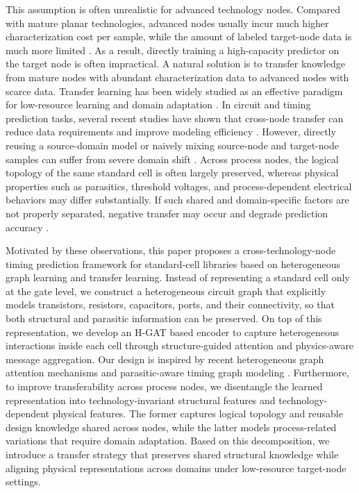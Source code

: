 This assumption is often unrealistic for advanced technology nodes. Compared with mature planar technologies, advanced nodes usually incur much higher characterization cost per sample, while the amount of labeled target-node data is much more limited \cite{amuru2024pvt,zhang2024disentangle}. As a result, directly training a high-capacity predictor on the target node is often impractical. A natural solution is to transfer knowledge from mature nodes with abundant characterization data to advanced nodes with scarce data. Transfer learning has been widely studied as an effective paradigm for low-resource learning and domain adaptation \cite{weiss2016survey,zhuang2021survey,dai2009eigentransfer,ganin2016dann}. In circuit and timing prediction tasks, several recent studies have shown that cross-node transfer can reduce data requirements and improve modeling efficiency \cite{shrestha2024arrival,amuru2024pvt,zhang2025prerouting}. However, directly reusing a source-domain model or naively mixing source-node and target-node samples can suffer from severe domain shift \cite{zhang2024disentangle}. Across process nodes, the logical topology of the same standard cell is often largely preserved, whereas physical properties such as parasitics, threshold voltages, and process-dependent electrical behaviors may differ substantially. If such shared and domain-specific factors are not properly separated, negative transfer may occur and degrade prediction accuracy \cite{tang2024semisupervised,tang2025knowledge,zhang2024disentangle}.

Motivated by these observations, this paper proposes a cross-technology-node timing prediction framework for standard-cell libraries based on heterogeneous graph learning and transfer learning. Instead of representing a standard cell only at the gate level, we construct a heterogeneous circuit graph that explicitly models transistors, resistors, capacitors, ports, and their connectivity, so that both structural and parasitic information can be preserved. On top of this representation, we develop an H-GAT based encoder to capture heterogeneous interactions inside each cell through structure-guided attention and physics-aware message aggregation. Our design is inspired by recent heterogeneous graph attention mechanisms and parasitic-aware timing graph modeling \cite{yang2021hgat,cheng2024hgat}. Furthermore, to improve transferability across process nodes, we disentangle the learned representation into technology-invariant structural features and technology-dependent physical features. The former captures logical topology and reusable design knowledge shared across nodes, while the latter models process-related variations that require domain adaptation. Based on this decomposition, we introduce a transfer strategy that preserves shared structural knowledge while aligning physical representations across domains under low-resource target-node settings.

